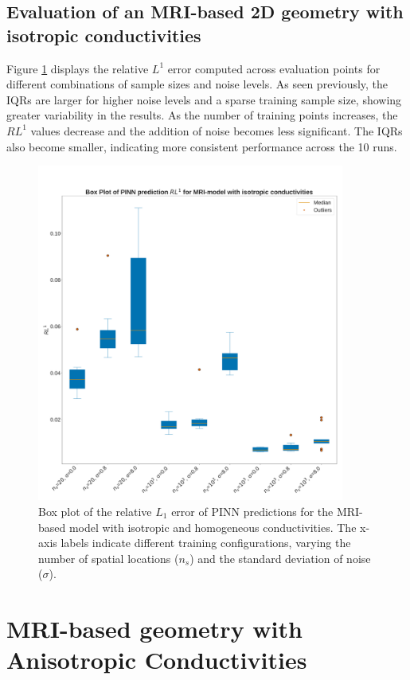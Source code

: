\subsection{Evaluation of an MRI-based 2D geometry with isotropic conductivities}
Figure \ref{fig:box_plot_MRI} displays the relative $L^1$ error computed across evaluation points for different combinations of sample sizes and noise levels.   As seen previously, the IQRs are larger for higher noise levels and a sparse training sample size, showing greater variability in the results. As the number of training points increases, the $RL^1$ values decrease and the addition of noise becomes less significant. The IQRs also become smaller, indicating more consistent performance across the 10 runs.
\begin{figure}[H]
  \centering
  \includegraphics[width=0.9\textwidth]{Figs/Isotropic/box_plot_iso.pdf}
  \caption{Box plot of the relative \( L_1 \) error of PINN predictions for the MRI-based model with isotropic and homogeneous conductivities. The x-axis labels indicate different training configurations, varying the number of spatial locations (\( n_s \)) and the standard deviation of noise (\( \sigma \)). }
  \label{fig:box_plot_MRI}
\end{figure}
\newpage
\section{MRI-based geometry with Anisotropic Conductivities}

